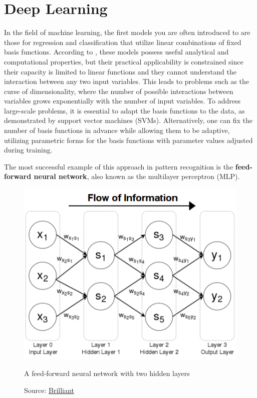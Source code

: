 \section{Deep Learning}

In the field of machine learning, the first models you
are often introduced to are those for regression
and classification that utilize linear
combinations of fixed basis functions.
According to \cite{Bishop:2008aa},
these models possess useful analytical and computational properties,
but their practical applicability is constrained 
since their capacity is limited to linear functions
and they cannot understand the interaction between any two input variables.
This leads to problems such as the curse of dimensionality,
where the number of possible interactions between variables grows exponentially
with the number of input variables.
To address large-scale problems, it is essential to adapt the basis functions
to the data, as demonstrated by support vector machines (SVMs).
Alternatively, one can fix the number of basis functions in advance while
allowing them to be adaptive, utilizing parametric forms for the basis
functions with parameter values adjusted during training.

The most successful example of this approach in pattern recognition is the
\textbf{feed-forward neural network},
also known as the multilayer perceptron (MLP).
\begin{figure}[h]
    \centering
    \includegraphics[width=.9\textwidth]{figures/ch3/1.mlp.png}
    \caption{A feed-forward neural network with two hidden layers}
    \vspace{-10px}
    \caption*{\scriptsize{Source: \href{https://brilliant.org/wiki/feedforward-neural-networks/}{Brilliant}}}
    \label{fig:mlp}
\end{figure}

